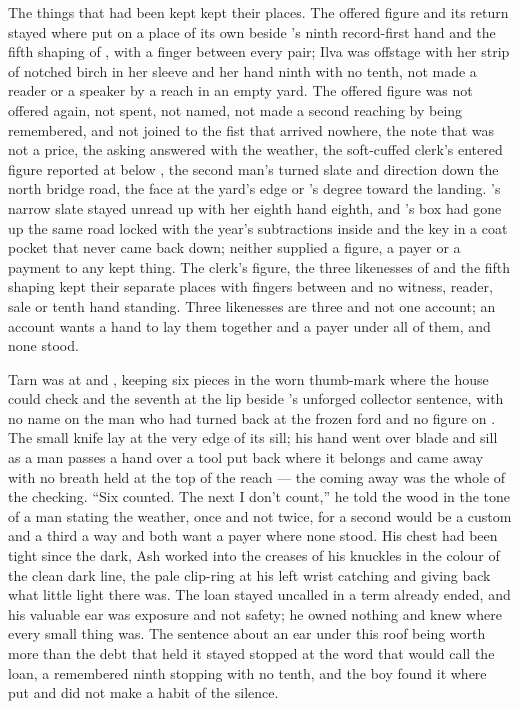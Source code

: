 The things that had been kept kept their places. The offered figure and its return stayed where put on a place of its own beside 's ninth record-first hand and the fifth shaping of , with a finger between every pair; Ilva was offstage with her strip of notched birch in her sleeve and her hand ninth with no tenth, not made a reader or a speaker by a reach in an empty yard. The offered figure was not offered again, not spent, not named, not made a second reaching by being remembered, and not joined to the fist that arrived nowhere, the note that was not a price, the asking answered with the weather, the soft-cuffed clerk's entered figure reported at  below , the second man's turned slate and direction down the north bridge road, the face at the yard's edge or 's degree toward the landing. 's narrow slate stayed unread up  with her eighth hand eighth, and 's box had gone up the same road locked with the year's subtractions inside and the key in a coat pocket that never came back down; neither supplied a figure, a payer or a payment to any kept thing. The clerk's figure, the three likenesses of  and the fifth shaping kept their separate places with fingers between and no witness, reader, sale or tenth hand standing. Three likenesses are three and not one account; an account wants a hand to lay them together and a payer under all of them, and none stood.

Tarn was at  and , keeping six pieces in the worn thumb-mark where the house could check and the seventh at the lip beside 's unforged collector sentence, with no name on the man who had turned back at the frozen ford and no figure on . The small knife lay at the very edge of its sill; his hand went over blade and sill as a man passes a hand over a tool put back where it belongs and came away with no breath held at the top of the reach --- the coming away was the whole of the checking. “Six counted. The next I don't count,” he told the wood in the tone of a man stating the weather, once and not twice, for a second would be a custom and a third a way and both want a payer where none stood. His chest had been tight since the dark, Ash worked into the creases of his knuckles in the colour of the clean dark line, the pale clip-ring at his left wrist catching and giving back what little light there was. The loan stayed uncalled in a term already ended, and his valuable ear was exposure and not safety; he owned nothing and knew where every small thing was. The sentence about an ear under this roof being worth more than the debt that held it stayed stopped at the word that would call the loan, a remembered ninth stopping with no tenth, and the boy found it where put and did not make a habit of the silence.

